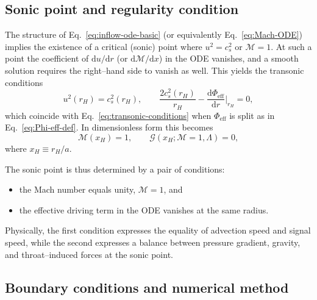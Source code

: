 \documentclass[11pt]{article}
\begin{document}
\subsection{Sonic point and regularity condition}
\label{app:inflow-sonic}

The structure of Eq.~\eqref{eq:inflow-ode-basic} (or equivalently
Eq.~\eqref{eq:Mach-ODE}) implies the existence of a critical (sonic) point
where \(u^2 = c_s^2\) or \(\mathcal{M} = 1\).  At such a point the
coefficient of \(\mathrm{d}u/\mathrm{d}r\) (or
\(\mathrm{d}\mathcal{M}/\mathrm{d}x\)) in the ODE vanishes, and a smooth
solution requires the right--hand side to vanish as well.  This yields the
transonic conditions
\begin{equation}
  u^2(r_H) = c_s^2(r_H),
  \qquad
  \frac{2 c_s^2(r_H)}{r_H}
  - \frac{\mathrm{d}\Phi_{\text{eff}}}{\mathrm{d}r}\bigg|_{r_H}
  = 0,
  \label{eq:transonic-conditions-app}
\end{equation}
which coincide with Eq.~\eqref{eq:transonic-conditions} when
\(\Phi_{\text{eff}}\) is split as in Eq.~\eqref{eq:Phi-eff-def}.  In
dimensionless form this becomes
\begin{equation}
  \mathcal{M}(x_H) = 1,
  \qquad
  \mathcal{G}(x_H; \mathcal{M}=1, \Lambda) = 0,
  \label{eq:transonic-dimensionless}
\end{equation}
where \(x_H \equiv r_H/a\).

The sonic point is thus determined by a pair of conditions:
\begin{itemize}
  \item the Mach number equals unity, \(\mathcal{M} = 1\), and
  \item the effective driving term in the ODE vanishes at the same
        radius.
\end{itemize}
Physically, the first condition expresses the equality of advection speed
and signal speed, while the second expresses a balance between pressure
gradient, gravity, and throat--induced forces at the sonic point.

\subsection{Boundary conditions and numerical method}
\label{app:inflow-numerics}
\end{document}
